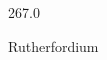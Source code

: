 \documentclass[12pt]{article}
\begin{document}
\hfill{}
\vfill
\begin{center}
  {\fontsize{50}{60}
  }

  267.0

Rutherfordium
\end{center}
\vfill
\end{document}
